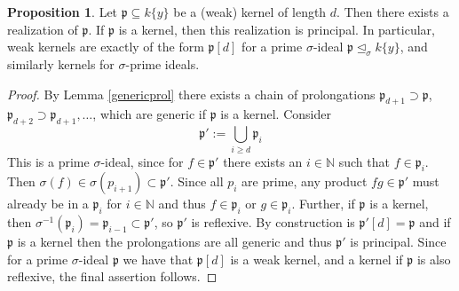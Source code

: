 \documentclass{article}
\def\N{\mathbb{N}}
\def\p{\mathfrak{p}}
\def\s{\sigma}
\def\si{\unlhd_{\sigma}}
\def\fa{\text{ for all }}
\newenvironment{bew}{\begin{proof}[Proof]}{\end{proof}}
\theoremstyle{definition}
\newtheorem{prop}[Satz]{Proposition}
\newtheorem{lem}[Satz]{Lemma}
\begin{document}
\begin{prop}
Let $\p \subseteq k\{y\}$ be a (weak) kernel of length $d$. Then there exists a realization of $\p$. If $\p$ is a kernel, then this realization is principal.
In particular, weak kernels are exactly of the form $\p[d]$ for a prime $\s$-ideal $\p \si k\{y\}$, and similarly kernels for $\s$-prime ideals.
\begin{bew}
By Lemma \ref{genericprol} there exists a chain of prolongations $\p_{d+1} \supset \p$, $\p_{d+2} \supset \p_{d+1}, \ldots$, which are generic if $\p$ is a kernel.
Consider \[ \p':= \bigcup_{i \geq d} \p_i \]
This is a prime $\s$-ideal, since for $f \in \p'$ there exists an $i \in \N$ such that $f \in \p_i$. Then $\s(f) \in \s(p_{i+1}) \subset \p'$.
Since all $p_i$ are prime, any product $fg \in \p'$ must already be in a $\p_i$ for $i \in \N$ and thus $f \in \p_i$ or $g \in \p_i$. Further,
 if $\p$ is a kernel, then $\s^{-1}(\p_i) = \p_{i-1} \subset \p'$, so $\p'$ is reflexive. By construction is $\p'[d] = \p$ and if $\p$ is a kernel then the
 prolongations are all generic and thus $\p'$ is principal. Since for a prime $\s$-ideal $\p$ we have that $\p[d]$ is a weak kernel, and a kernel if $\p$ is also reflexive, 
the final assertion follows.
\end{bew}
\end{prop}






\end{document}
